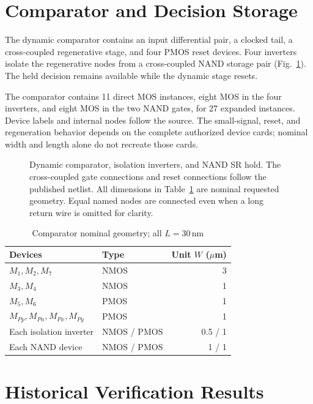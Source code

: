 \documentclass[10pt,conference,letterpaper]{IEEEtran}
\begin{document}
\section{Comparator and Decision Storage}
The dynamic comparator contains an input differential pair, a clocked tail, a cross-coupled regenerative stage, and four PMOS reset devices. Four inverters isolate the regenerative nodes from a cross-coupled NAND storage pair (Fig.~\ref{fig:comparator}). The held decision remains available while the dynamic stage resets.

The comparator contains 11 direct MOS instances, eight MOS in the four inverters, and eight MOS in the two NAND gates, for 27 expanded instances. Device labels and internal nodes follow the source. The small-signal, reset, and regeneration behavior depends on the complete authorized device cards; nominal width and length alone do not recreate those cards.

\begin{figure}[!t]\centering
\resizebox{.96\textwidth}{!}{}
\caption{Dynamic comparator, isolation inverters, and NAND SR hold. The cross-coupled gate connections and reset connections follow the published netlist. All dimensions in Table~\ref{tab:compgeom} are nominal requested geometry. Equal named nodes are connected even when a long return wire is omitted for clarity.}\label{fig:comparator}
\end{figure}

\begin{table}[!t]\centering
\caption{Comparator nominal geometry; all $L=30$\,nm}\label{tab:compgeom}
\begin{tabular}{llr}\toprule
Devices & Type & Unit $W$ ($\mu$m)\\\midrule
$M_1,M_2,M_7$ & NMOS & 3\\
$M_3,M_4$ & NMOS & 1\\
$M_5,M_6$ & PMOS & 1\\
$M_{Pp},M_{Pn},M_{Px},M_{Py}$ & PMOS & 1\\
Each isolation inverter & NMOS / PMOS & 0.5 / 1\\
Each NAND device & NMOS / PMOS & 1 / 1\\\bottomrule
\end{tabular}
\end{table}



\section{Historical Verification Results}
\end{document}

